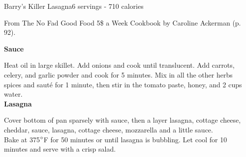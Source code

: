 \begin{recipe}{Barry's Killer Lasagna}{6 servings - 710 calories}{}

\freeform From {\normalfont The No Fad Good Food 5\$ a Week Cookbook} by Caroline Ackerman (p. 92).


\textbf{Sauce}

Heat oil in large skillet. Add onions and cook until translucent. Add carrots, celery, and garlic powder and cook for 5 minutes. Mix in all the other herbs spices and sauté for 1 minute, then stir in the tomato paste, honey, and 2 cups water.\\

\textbf{Lasagna}

Cover bottom of pan sparsely with sauce, then a layer lasagna, cottage cheese,
cheddar, sauce, lasagna, cottage cheese, mozzarella and a little sauce.\\

Bake at 375$\degree$F for 50 minutes or until lasagna is bubbling. Let cool for 10 minutes and serve with a crisp salad.

\end{recipe}